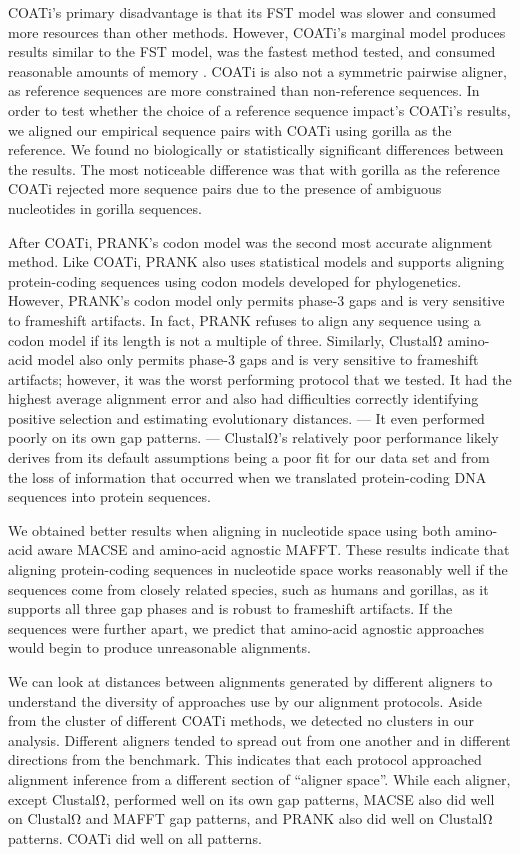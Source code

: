 \documentclass[12pt,letterpaper]{article}
\begin{document}
COATi's primary disadvantage is that its FST model was slower and consumed more resources than other methods. However, COATi's marginal model produces results similar to the FST model, was the fastest method tested, and consumed reasonable amounts of memory \citep{garcia2023dissertation}. COATi is also not a symmetric pairwise aligner, as reference sequences are more constrained than non-reference sequences.
%
In order to test whether the choice of a reference sequence impact's COATi's results, we aligned our empirical sequence pairs with COATi using gorilla as the reference. We found no biologically or statistically significant differences between the results. The most noticeable difference was that with gorilla as the reference COATi rejected more sequence pairs due to the presence of ambiguous nucleotides in gorilla sequences.

After COATi, PRANK's codon model was the second most accurate alignment method. Like COATi, PRANK also uses statistical models and supports aligning protein-coding sequences using codon models developed for phylogenetics. However, PRANK's codon model only permits phase-3 gaps and is very sensitive to frameshift artifacts. In fact, PRANK refuses to align any sequence using a codon model if its length is not a multiple of three. Similarly, ClustalΩ amino-acid model also only permits phase-3 gaps and is very sensitive to frameshift artifacts; however, it was the worst performing protocol that we tested. It had the highest average alignment error and also had difficulties correctly identifying positive selection and estimating evolutionary distances.  --- It even performed poorly on its own gap patterns. --- ClustalΩ's relatively poor performance likely derives from its default assumptions being a poor fit for our data set and from the loss of information that occurred when we translated protein-coding DNA sequences into protein sequences.

We obtained better results when aligning in nucleotide space using both amino-acid aware MACSE and amino-acid agnostic MAFFT. These results indicate that aligning protein-coding sequences in nucleotide space works reasonably well if the sequences come from closely related species, such as humans and gorillas, as it supports all three gap phases and is robust to frameshift artifacts. If the sequences were further apart, we predict that amino-acid agnostic approaches would begin to produce unreasonable alignments. 

We can look at distances between alignments generated by different aligners to understand the diversity of approaches use by our alignment protocols. Aside from the cluster of different COATi methods, we detected no clusters in our analysis. Different aligners tended to spread out from one another and in different directions from the benchmark. This indicates that each protocol approached alignment inference from a different section of ``aligner space''. While each aligner, except ClustalΩ, performed well on its own gap patterns, MACSE also did well on ClustalΩ and MAFFT gap patterns, and PRANK also did well on ClustalΩ patterns. COATi did well on all patterns.
\end{document}

